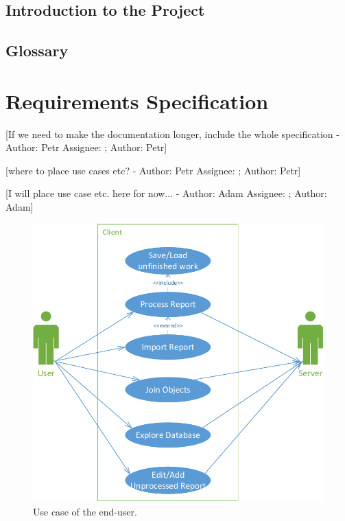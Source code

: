 \documentclass[12pt,a4paper]{report}
\makeatletter
\newcommand{\comment}[3][\@empty]{
  {\color{magenta}[#3 - }
  {\color{green}\ifx\@empty#1\relax Author: #2 \else Assignee: #1; Author: #2\fi}{\color{magenta}]}
}
\makeatother
\begin{document}
\section{Introduction to the Project}



\section{Glossary}


\chapter{Requirements Specification}
\comment{Petr}{If we need to make the documentation longer, include the whole specification}


\comment{Petr}{where to place use cases etc?}

\comment{Adam}{I will place use case etc. here for now...}

\begin{figure}[!htb]
        \centering
        \includegraphics[width=\textwidth]{Images/UseCase1}
        \caption{Use case of the end-user.}
        \label{fig:UseCase1}
\end{figure}
\end{document}

